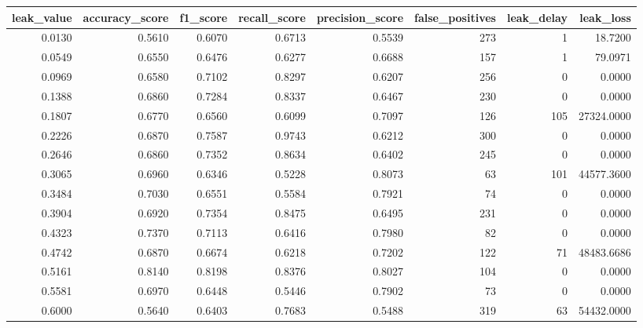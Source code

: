 \begin{tabular}{rrrrrrrr}
\toprule
leak\_value & accuracy\_score & f1\_score & recall\_score & precision\_score & false\_positives & leak\_delay & leak\_loss \\
\midrule
0.0130 & 0.5610 & 0.6070 & 0.6713 & 0.5539 & 273 & 1 & 18.7200 \\
0.0549 & 0.6550 & 0.6476 & 0.6277 & 0.6688 & 157 & 1 & 79.0971 \\
0.0969 & 0.6580 & 0.7102 & 0.8297 & 0.6207 & 256 & 0 & 0.0000 \\
0.1388 & 0.6860 & 0.7284 & 0.8337 & 0.6467 & 230 & 0 & 0.0000 \\
0.1807 & 0.6770 & 0.6560 & 0.6099 & 0.7097 & 126 & 105 & 27324.0000 \\
0.2226 & 0.6870 & 0.7587 & 0.9743 & 0.6212 & 300 & 0 & 0.0000 \\
0.2646 & 0.6860 & 0.7352 & 0.8634 & 0.6402 & 245 & 0 & 0.0000 \\
0.3065 & 0.6960 & 0.6346 & 0.5228 & 0.8073 & 63 & 101 & 44577.3600 \\
0.3484 & 0.7030 & 0.6551 & 0.5584 & 0.7921 & 74 & 0 & 0.0000 \\
0.3904 & 0.6920 & 0.7354 & 0.8475 & 0.6495 & 231 & 0 & 0.0000 \\
0.4323 & 0.7370 & 0.7113 & 0.6416 & 0.7980 & 82 & 0 & 0.0000 \\
0.4742 & 0.6870 & 0.6674 & 0.6218 & 0.7202 & 122 & 71 & 48483.6686 \\
0.5161 & 0.8140 & 0.8198 & 0.8376 & 0.8027 & 104 & 0 & 0.0000 \\
0.5581 & 0.6970 & 0.6448 & 0.5446 & 0.7902 & 73 & 0 & 0.0000 \\
0.6000 & 0.5640 & 0.6403 & 0.7683 & 0.5488 & 319 & 63 & 54432.0000 \\
\bottomrule
\end{tabular}
